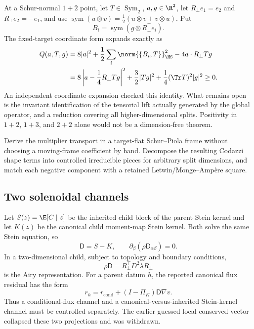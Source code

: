 \documentclass[../../main.tex]{subfiles}
\begin{document}
At a Schur-normal $1+2$ point, let $T\in\operatorname{Sym}_2$, $a,g\in\R^2$, let
$R_\perp e_1=e_2$ and $R_\perp e_2=-e_1$, and use
$\operatorname{sym}(u\otimes v)=\tfrac12(u\otimes v+v\otimes u)$. Put
\[
  B_i=\operatorname{sym}(g\otimes R_\perp^\top e_i).
\]
The fixed-target coordinate form expands exactly as
\begin{align*}
Q(a,T,g)
&=8|a|^2+\frac12\sum_i\norm{\{B_i,T\}}_{\HS}^2-4a\cdot R_\perp Tg\\
&=8\left|a-\frac14R_\perp Tg\right|^2
  +\frac32|Tg|^2+\frac14(\Tr T)^2|g|^2\ge0.
\end{align*}
An independent coordinate expansion checked this identity. What remains open is the invariant
identification of the tensorial lift actually generated by the global operator, and a reduction
covering all higher-dimensional splits. Positivity in $1+2$, $1+3$, and $2+2$ alone would not be
a dimension-free theorem.

\begin{question}
\label{q:mm-invariant-lift}
Derive the multiplier transport in a target-flat Schur--Piola frame without choosing a moving-frame
coefficient by hand. Decompose the resulting Codazzi shape terms into controlled irreducible
pieces for arbitrary split dimensions, and match each negative component with a retained
Letwin/Monge--Amp\`ere square.
\end{question}

\subsection{Two solenoidal channels}

Let $S(z)=\E[C\mid z]$ be the inherited child block of the parent Stein kernel and let $K(z)$ be
the canonical child moment-map Stein kernel. Both solve the same Stein equation, so
\[
  \mathsf D=S-K,
  \qquad \partial_\beta(\rho\mathsf D_{\alpha\beta})=0.
\]
In a two-dimensional child, subject to topology and boundary conditions,
\[
  \rho\mathsf D=R_\perp^\top D^2\lambda R_\perp
\]
is the Airy representation. For a parent datum $h$, the reported canonical flux residual has the
form
\begin{equation}
  r_h=r_{\mathrm{cond}}+(I-\Pi_K)\mathsf D\nabla v.
  \label{eq:mm-hodge-residual}
\end{equation}
Thus a conditional-flux channel and a canonical-versus-inherited Stein-kernel channel must be
controlled separately. The earlier guessed local conserved vector collapsed these two projections
and was withdrawn.
\end{document}
